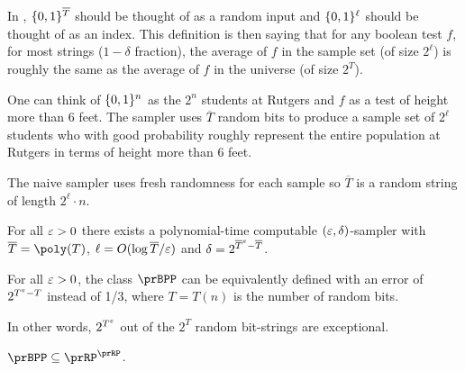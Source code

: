 In , $\{0,1\}^{\overline{T}}$ should be thought of as a random input and $\{0,1\}^\ell$ should be thought of as an index. This definition is then saying that for any boolean test $f$, for most strings ($1-\delta$ fraction), the average of $f$ in the sample set (of size $2^{\ell}$) is roughly the same as the average of $f$ in the universe (of size $2^T$).

One can think of $\{0,1\}^n$ as the $2^n$ students at Rutgers and $f$ as a test of height more than $6$ feet. The sampler uses $\overline{T}$ random bits to produce a sample set of $2^\ell$ students who with good probability roughly represent the entire population at Rutgers in terms of height more than $6$ feet.

The naive sampler uses fresh randomness for each sample so $\overline{T}$ is a random string of length $2^\ell \cdot n$.

\begin{theorem}
  For all $\varepsilon > 0$ there exists a polynomial-time computable $(\varepsilon,
  \delta)$-sampler with $\overline{T} = \poly(T)$, $\ell = O(\log
  \overline{T}/\varepsilon)$ and $\delta = 2^{\overline{T}^\varepsilon - \overline{T}}$.
\end{theorem}

\begin{corollary}\label{cor:bpp-small-random}
  For all $\varepsilon > 0$, the class $\prBPP$ can be equivalently defined with an
  error of $2^{T^\varepsilon - T}$ instead of 1/3, where $T = T(n)$ is the number of
  random bits.

  In other words, $2^{T^\varepsilon}$ out of the $2^T$ random bit-strings are exceptional.
\end{corollary}

\begin{theorem}\label{thm:bpp-subset-rprp}
    $\prBPP \subseteq \prRP^\prRP$.
\end{theorem}

